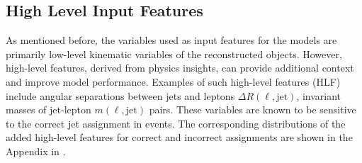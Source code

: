 \subsection{High Level Input Features}
As mentioned before, the variables used as input features for the models are primarily low-level kinematic variables of the reconstructed objects. However, high-level features, derived from physics insights, can provide additional context and improve model performance. Examples of such high-level features (HLF) include angular separations between jets and leptons $\Delta R(\ell,\text{jet})$, invariant masses of jet-lepton $m(\ell,\text{jet})$ pairs. These variables are known to be sensitive to the correct jet assignment in \ttbar events. The  corresponding distributions of the added high-level features for correct and incorrect assignments are shown in the Appendix in .

